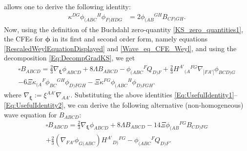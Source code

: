 \documentclass[10pt,a4paper]{article}
\theoremstyle{plain}
\begin{document}
allows one to derive the following identity:
\begin{align}
  \kappa^{DG}\phi_{(ABC}{}^H\phi_{F)HDG}&=2\phi_{(AB}{}^{GH}B_{CF)GH}.
  \label{Eq:UsefulIdentity2}
\end{align}
Now, using the definition of the Buchdahl zero-quantity
\eqref{KS_zero_quantities1}, the CFEs for $\bm\phi$ in its first and
second order form, namely equations
\eqref{RescaledWeylEquationDisplayed} and \eqref{Wave_eq_CFE_Weyl},
and using the decomposition \eqref{Eq:DecompGradKS}, we get
\begin{multline} 
  \square B_{ABCD} = \tfrac{2}{3} \nabla_{\bm\xi}\phi_{ABCD} + 8
  \Lambda B_{ABCD} - \phi_{(ABC}{}^{F}Q_{D)F} + \tfrac{2}{3}
  H^{A'}{}_{(A}{}^{FG}\nabla_{|FA'|}\phi_{BCD)G} \\ - 6 \Xi
  \kappa_{(A}{}^{F}\phi_{BC}{}^{GH}\phi_{D)FGH} - \Xi
  \kappa^{FG}\phi_{(ABC}{}^{H}\phi_{D)FGH}.
\end{multline}
where $\nabla_{\bm\xi} := \xi^{AA'}\nabla_{AA'}$. Substituting the
above identities
\eqref{Eq:UsefulIdentity1}--\eqref{Eq:UsefulIdentity2}, we can derive
the following alternative (non-homogeneous) wave equation for
$B_{ABCD}$:
\begin{multline}
    \square B_{ABCD} = \tfrac{2}{3}\nabla_{\bm\xi}\phi_{ABCD} +
    8\Lambda B_{ABCD} - 14\Xi \phi_{(AB}{}^{FG}B_{CD)FG} \\ +
    \tfrac{2}{3}(\nabla_{FA'}\phi_{G(ABC})H^{A'}{}_{D)}{}^{FG} -
    \phi_{(ABC}{}^{F}Q_{D)F}. \label{Eq:SecondWaveEqForB}
\end{multline}
\end{document}
